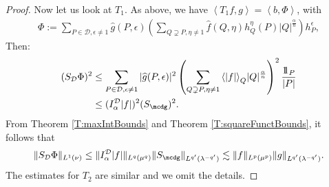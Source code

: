 \documentclass[12pt]{amsart}
\begin{document}
\begin{proof}
Now let us look at $T_1$. As above, we have ${\ensuremath{\left\langle{T_1 f},{g}\right\rangle}}={\ensuremath{\left\langle{b},{\Phi}\right\rangle}}$, with 
\begin{align*}
\Phi:=
\sum_{P\in{\mathcal{D}}, {\epsilon}\neq 1} 
  \widehat{g}(P,{\epsilon}) \left( \sum_{Q \supsetneq P, \eta\neq 1} 
  \widehat{f}(Q,\eta) h_Q^{\eta}(P) |Q|^{\frac{\alpha}{n}} \right) 
  h_P^{\epsilon},
\end{align*}
Then:
\begin{align*}
(S_{\mathcal{D}} \Phi)^2 
& \leq \sum_{P\in{\mathcal{D}},{\epsilon}\neq 1} |\widehat{g}(P,{\epsilon})|^2 
  \left( \sum_{Q\supsetneq P, \eta\neq 1} {\langle } |f|{\rangle }_Q 
  |Q|^{\frac{\alpha}{n}} \right)^2 \frac{{1\!\!1}_P}{|P|}
 
 
  
\\&\leq (I_{\alpha}^{\mathcal{D}}|f|)^2 (S_\mcdg)^2.
\end{align*}
From Theorem \ref{T:maxIntBounds} and Theorem \ref{T:squareFunctBounds}, 
it follows that
\begin{align*}
\|S_{\mathcal{D}}\Phi\|_{L^1(\nu)} 
\leq \|I_{\alpha}^{\mathcal{D}} |f| \|_{L^q(\mu^q)} 
  \|S_\mcdg\|_{L^{q'}({\lambda}^{-q'})} 
\lesssim \|f\|_{L^p(\mu^p)} \|g\|_{L^{q'}({\lambda}^{-q'})}.
\end{align*}
The estimates for $T_2$ are similar and we omit the details.
\end{proof}
\end{document}
